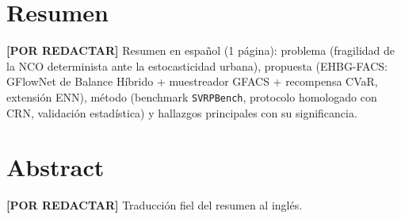 \documentclass[12pt]{report}
\newcommand{\pendiente}[1]{\par\noindent\colorbox{lightbg}{%
  \begin{minipage}{0.94\linewidth}\small
  \textcolor{uanlgold}{\textbf{[POR REDACTAR]}} #1
  \end{minipage}}\par\medskip}
\begin{document}
\chapter*{Resumen}
\pendiente{Resumen en espa\~nol (1 p\'agina): problema (fragilidad de la NCO
determinista ante la estocasticidad urbana), propuesta (EHBG-FACS: GFlowNet de
Balance H\'ibrido + muestreador GFACS + recompensa CVaR, extensi\'on ENN),
m\'etodo (benchmark \texttt{SVRPBench}, protocolo homologado con CRN, validaci\'on
estad\'istica) y hallazgos principales con su significancia.}

\chapter*{Abstract}
\pendiente{Traducci\'on fiel del resumen al ingl\'es.}

\tableofcontents
\newpage
\listoffigures
{}
\newpage
\listoftables
{}
\newpage

\end{document}
